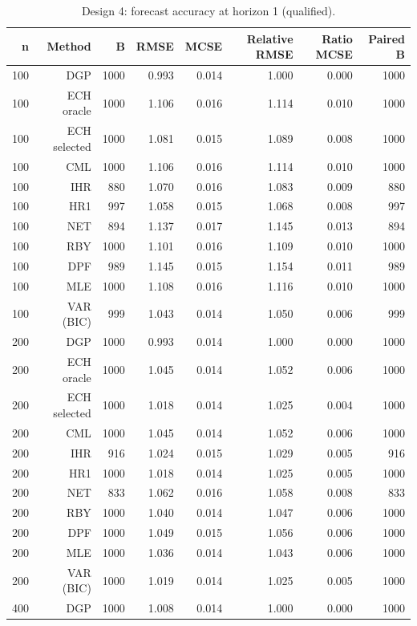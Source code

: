 \begin{table}[p]\centering
\caption{Design 4: forecast accuracy at horizon 1 (qualified).}
\small
\begin{tabular}{rrrrrrrr}\toprule
n & Method & B & RMSE & MCSE & Relative RMSE & Ratio MCSE & Paired B \\\midrule
100 & DGP & 1000 & 0.993 & 0.014 & 1.000 & 0.000 & 1000 \\
100 & ECH oracle & 1000 & 1.106 & 0.016 & 1.114 & 0.010 & 1000 \\
100 & ECH selected & 1000 & 1.081 & 0.015 & 1.089 & 0.008 & 1000 \\
100 & CML & 1000 & 1.106 & 0.016 & 1.114 & 0.010 & 1000 \\
100 & IHR &  880 & 1.070 & 0.016 & 1.083 & 0.009 &  880 \\
100 & HR1 &  997 & 1.058 & 0.015 & 1.068 & 0.008 &  997 \\
100 & NET &  894 & 1.137 & 0.017 & 1.145 & 0.013 &  894 \\
100 & RBY & 1000 & 1.101 & 0.016 & 1.109 & 0.010 & 1000 \\
100 & DPF &  989 & 1.145 & 0.015 & 1.154 & 0.011 &  989 \\
100 & MLE & 1000 & 1.108 & 0.016 & 1.116 & 0.010 & 1000 \\
100 & VAR (BIC) &  999 & 1.043 & 0.014 & 1.050 & 0.006 &  999 \\
200 & DGP & 1000 & 0.993 & 0.014 & 1.000 & 0.000 & 1000 \\
200 & ECH oracle & 1000 & 1.045 & 0.014 & 1.052 & 0.006 & 1000 \\
200 & ECH selected & 1000 & 1.018 & 0.014 & 1.025 & 0.004 & 1000 \\
200 & CML & 1000 & 1.045 & 0.014 & 1.052 & 0.006 & 1000 \\
200 & IHR &  916 & 1.024 & 0.015 & 1.029 & 0.005 &  916 \\
200 & HR1 & 1000 & 1.018 & 0.014 & 1.025 & 0.005 & 1000 \\
200 & NET &  833 & 1.062 & 0.016 & 1.058 & 0.008 &  833 \\
200 & RBY & 1000 & 1.040 & 0.014 & 1.047 & 0.006 & 1000 \\
200 & DPF & 1000 & 1.049 & 0.015 & 1.056 & 0.006 & 1000 \\
200 & MLE & 1000 & 1.036 & 0.014 & 1.043 & 0.006 & 1000 \\
200 & VAR (BIC) & 1000 & 1.019 & 0.014 & 1.025 & 0.005 & 1000 \\
400 & DGP & 1000 & 1.008 & 0.014 & 1.000 & 0.000 & 1000 \\

\end{tabular}
\end{table}
